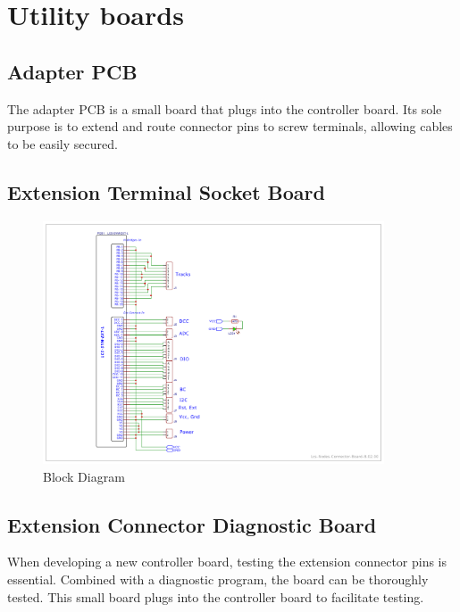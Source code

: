\chapter{Utility boards}

\section{Adapter PCB}

The adapter PCB is a small board that plugs into the controller board. Its sole purpose is to extend and route connector pins to screw terminals, allowing cables to be easily secured.

\section{Extension Terminal Socket Board}

\begin{figure}[htbp]
    \centering
    \includegraphics[page=1, width=0.9\textwidth]{./Schematics/Schematic_LcsNodes-Connector-Board.pdf}
    \caption{Block Diagram}
\end{figure}
\FloatBarrier

\section{Extension Connector Diagnostic Board}

When developing a new controller board, testing the extension connector pins is essential. Combined with a diagnostic program, the board can be thoroughly tested. This small board plugs into the controller board to facilitate testing.

